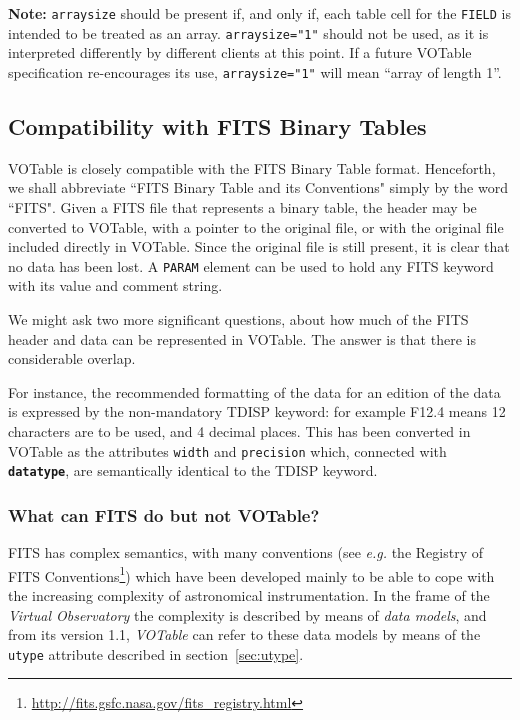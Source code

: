 \documentclass[11pt,a4paper]{ivoa}
\def\Aref#1{section~\ref{#1}}
\let\fg=\color
\def\attr#1{{\tt{\fg{DarkRed}#1}}}
\def\elem#1{{\tt{\fg{DarkRed}#1}}}
\def\attrval#1#2{{\tt{\fg{DarkRed}#1}="{\fg{DarkPurple}#2}"}}
\begin{document}
\textbf{Note:} \attr{arraysize} should be present if, and only if, each table
cell for the \elem{FIELD} is intended to be treated as an array.
\attrval{arraysize}{1}
should not be used, as it is interpreted differently by different
clients at this point. If a future VOTable specification re-encourages
its use, \attrval{arraysize}{1} will mean ``array of length 1''.

\subsection{Compatibility with FITS Binary Tables}

VOTable is closely compatible with the FITS Binary Table format.
Henceforth, we shall abbreviate ``FITS Binary Table  and its
Conventions" simply by the word ``FITS". Given a FITS
file that represents a binary table, the header may be converted to
VOTable, with a pointer to the original file, or with the original
file included directly in VOTable. Since the original file is still
present, it is clear that no data has been lost. A {\elem{PARAM}}
element can be used to hold any FITS keyword with its value
and comment string.

We might ask two more significant questions, about how much of
the FITS header and data can be represented in VOTable. The answer is
that there is considerable overlap.

For instance, the recommended formatting of the data for an
edition of the data is expressed by the non-mandatory TDISP keyword:
for example F12.4 means 12 characters are to be used, and 4 decimal
places. This has been converted in VOTable as the attributes {\attr{width}}
and {\attr{precision}}
which, connected with {\bf {\attr{datatype}}},
are semantically identical to the TDISP keyword.

\subsubsection*{What can FITS do but not VOTable?}

FITS has complex semantics, with many conventions
(see {\em e.g.} the Registry of FITS
 Conventions\footnote{\url{http://fits.gsfc.nasa.gov/fits_registry.html}})
which have been developed
mainly to be able to cope with the increasing complexity
of astronomical instrumentation. In the frame of the
{\em Virtual Observatory} the complexity is described by
means of {\em data models}, and from its version 1.1,
{\em VOTable} can refer to these data models by means
of the \attr{utype} attribute described in
\Aref{sec:utype}.
\end{document}
